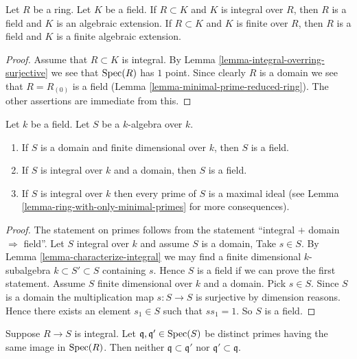 \begin{lemma}
\label{lemma-integral-under-field}
Let $R$ be a ring. Let $K$ be a field.
If $R \subset K$ and $K$ is integral over $R$,
then $R$ is a field and $K$ is an algebraic extension.
If $R \subset K$ and $K$ is finite over $R$,
then $R$ is a field and $K$ is a finite algebraic extension.
\end{lemma}

\begin{proof}
Assume that $R \subset K$ is integral.
By Lemma \ref{lemma-integral-overring-surjective} we see that
$\mathop{\mathrm{Spec}}(R)$ has $1$ point. Since clearly $R$ is a domain we see
that $R = R_{(0)}$ is a field (Lemma \ref{lemma-minimal-prime-reduced-ring}).
The other assertions are immediate from this.
\end{proof}

\begin{lemma}
\label{lemma-integral-over-field}
Let $k$ be a field. Let $S$ be a $k$-algebra over $k$.
\begin{enumerate}
\item If $S$ is a domain and finite dimensional over $k$,
then $S$ is a field.
\item If $S$ is integral over $k$ and a domain,
then $S$ is a field.
\item If $S$ is integral over $k$ then every prime of
$S$ is a maximal ideal (see
Lemma \ref{lemma-ring-with-only-minimal-primes}
for more consequences).
\end{enumerate}
\end{lemma}

\begin{proof}
The statement on primes follows from the statement
``integral $+$ domain $\Rightarrow$ field''.
Let $S$ integral over $k$ and assume $S$ is a domain,
Take $s \in S$. By Lemma
\ref{lemma-characterize-integral} we may find a
finite dimensional $k$-subalgebra $k \subset S' \subset S$
containing $s$. Hence $S$ is a field if we can prove the
first statement. Assume $S$ finite dimensional
over $k$ and a domain. Pick $s\in S$.
Since $S$ is a domain the multiplication
map $s : S \to S$ is surjective by dimension
reasons. Hence there exists an element $s_1 \in S$
such that $ss_1 = 1$. So $S$ is a field.
\end{proof}

\begin{lemma}
\label{lemma-integral-no-inclusion}
Suppose $R \to S$ is integral.
Let $\mathfrak q, \mathfrak q' \in \mathop{\mathrm{Spec}}(S)$
be distinct primes
having the same image in $\mathop{\mathrm{Spec}}(R)$.
Then neither $\mathfrak q \subset \mathfrak q'$
nor $\mathfrak q' \subset \mathfrak q$.
\end{lemma}

